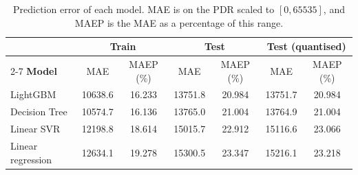 \begin{table}[htbp]
    \centering
    \caption{Prediction error of each model. MAE is on the PDR scaled
    to $[0, 65535]$, and MAEP is the MAE as a percentage of this range.}
    \label{tab:model_results}
    \begin{tabular}{l|c|c|c|c|c|c}
        \hline
        & \multicolumn{2}{c|}{Train}
        & \multicolumn{2}{c|}{Test}
        & \multicolumn{2}{c}{Test (quantised)} \\
        \cline{2-7}
        \textbf{Model}
        & MAE & MAEP (\%) & MAE & MAEP (\%) & MAE & MAEP (\%) \\
        \hline
        LightGBM          & 10638.6 & 16.233 & 13751.8 & 20.984 & 13751.7 &
        20.984 \\
        Decision Tree     & 10574.7 & 16.136 & 13765.0 & 21.004 & 13764.9 &
        21.004 \\
        Linear SVR        & 12198.8 & 18.614 & 15015.7 & 22.912 & 15116.6 &
        23.066 \\
        Linear regression & 12634.1 & 19.278 & 15300.5 & 23.347 & 15216.1 &
        23.218 \\
        \hline
    \end{tabular}
\end{table}
